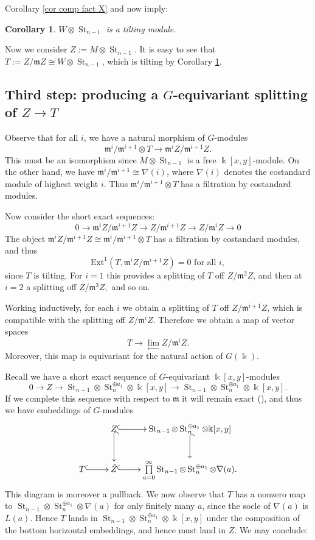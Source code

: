 \documentclass[11pt]{amsart}
\def\m{\mathfrak{m}}
\def\Ext{\text{Ext}}
\newtheorem{cor}[thm]{Corollary}
\theoremstyle{definition}
\theoremstyle{remark}
\numberwithin{equation}{section}
\begin{document}
Corollary \ref{cor comp fact X} and \cite[Lem.~3.3]{BEO} now imply:
\begin{cor}\label{cor}
    $W\otimes\operatorname{St}_{n-1}$ is a tilting module.
\end{cor}

Now we consider $Z:=M\otimes\operatorname{St}_{n-1}$.  It is easy to see that $T:=Z/\m Z\cong W\otimes\operatorname{St}_{n-1}$, which is tilting by Corollary \ref{cor}. 

\subsection{Third step: producing a $G$-equivariant splitting of $Z\to T$}

Observe that for all $i$, we have a natural morphism of $G$-modules
\[
\m^i/\m^{i+1}\otimes T\to \m^iZ/\m^{i+1} Z.
\]
This must be an isomorphism since $M\otimes \operatorname{St}_{n-1}$ is a free $\Bbbk[x,y]$-module.  On the other hand, we have $\m^i/\m^{i+1}\cong \nabla(i)$, where $\nabla(i)$ denotes the costandard module of highest weight $i$.  Thus $\m^i/\m^{i+1}\otimes T$ has a filtration by costandard modules. 

Now consider the short exact sequences:
\[
0\to \m^i Z/\m^{i+1}Z\to Z/\m^{i+1} Z\to Z/\m^i Z\to 0
\]
The object $\m^i Z/\m^{i+1}Z\cong\m^i/\m^{i+1}\otimes T$ has a filtration by costandard modules, and thus
\[
\Ext^1(T,\m^iZ/\m^{i+1}Z)=0 \text{ for all }i,
\]
since $T$ is tilting.  For $i=1$ this provides a splitting of $T$ off $Z/\m^2Z$, and then at $i=2$ a splitting off $Z/\m^3Z,$ and so on.

Working inductively, for each $i$ we obtain a splitting of $T$ off $Z/\m^{i+1}Z$, which is compatible with the splitting off $Z/\m^{i}Z$.  Therefore we obtain a map of vector spaces 
\[
T\to\lim\limits_{\leftarrow}Z/\m^iZ.
\]
Moreover, this map is equivariant for the natural action of $G(\Bbbk)$. 

Recall we have a short exact sequence of $G$-equivariant $\Bbbk[x,y]$-modules
\[
0\to Z\to\operatorname{St}_{n-1}\otimes \operatorname{St}_n^{\oplus a_1}\otimes\Bbbk[x,y]\to \operatorname{St}_{n-1}\otimes \operatorname{St}_n^{\oplus a_1}\otimes\Bbbk[x,y].
\]
If we complete this sequence with respect to $\m$ it will remain exact (\cite[Lem.~10.97.1]{Stacks}), and thus we have embeddings of $G$-modules
\[
\xymatrix{
 & Z \ar@{^{(}->}[d] \ar@{^{(}->}[r] & \operatorname{St}_{n-1}\otimes \operatorname{St}_n^{\oplus a_1}\otimes\Bbbk[x,y] \ar@{^{(}->}[d] \\ T\ar@{^{(}->}[r] & \hat{Z}\ar@{^{(}->}[r] & \prod\limits_{a=0}^\infty \operatorname{St}_{n-1}\otimes \operatorname{St}_n^{\oplus a_1}\otimes\nabla(a).
}
\]
This diagram is moreover a pullback.  We now observe that $T$ has a nonzero map to $\operatorname{St}_{n-1}\otimes \operatorname{St}_n^{\oplus a_1}\otimes\nabla(a)$ for only finitely many $a$, since the socle of $\nabla(a)$ is $L(a)$.  Hence $T$ lands in $\operatorname{St}_{n-1}\otimes \operatorname{St}_n^{\oplus a_1}\otimes\Bbbk[x,y]$ under the composition of the bottom horizontal embeddings, and hence must land in $Z$.  We may conclude:
\end{document}
